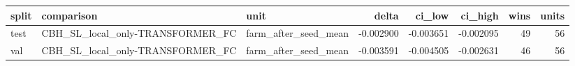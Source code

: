 \begin{tabular}{lllrrrrr}
\toprule
split & comparison & unit & delta & ci\_low & ci\_high & wins & units \\
\midrule
test & CBH\_SL\_local\_only-TRANSFORMER\_FC & farm\_after\_seed\_mean & -0.002900 & -0.003651 & -0.002095 & 49 & 56 \\
val & CBH\_SL\_local\_only-TRANSFORMER\_FC & farm\_after\_seed\_mean & -0.003591 & -0.004505 & -0.002631 & 46 & 56 \\
\bottomrule
\end{tabular}
